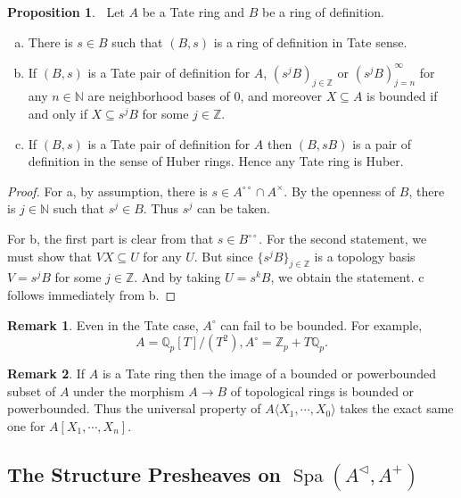 \documentclass[10pt]{article}
\numberwithin{equation}{section}
\theoremstyle{definition}
\newtheorem{proposition}{Proposition}[subsection]
\newtheorem{remark}{Remark}[subsection]
\DeclareMathOperator{\Spa}{Spa}
\newcommand{\N}[0]{\mathbb{N}}
\newcommand{\Z}[0]{\mathbb{Z}}
\newcommand{\Q}[0]{\mathbb{Q}}
\newcommand{\dcirc}[0]{{\circ\circ}}
\begin{document}
\begin{proposition}$\:$
    \label{fact_18_11}
    Let $A$ be a Tate ring and $B$ be a ring of definition.
    \begin{enumerate}[a.]
        \item There is $s\in B$ such that $(B,s)$ is a ring of definition in Tate sense.
        \item If $(B,s)$ is a Tate pair of definition for $A$, $(s^jB)_{j\in\Z}$ or $(s^jB)^{\infty}_{j=n}$ for any $n\in\N$ are neighborhood bases of $0$, and moreover $X\subseteq A$ is bounded if and only if $X\subseteq s^jB$ for some $j\in\Z$.
        \item If $(B,s)$ is a Tate pair of definition for $A$ then $(B,sB)$ is a pair of definition in the sense of Huber rings. Hence any Tate ring is Huber.
    \end{enumerate}
\end{proposition}

\begin{proof}
    For a, by assumption, there is $s\in A^\dcirc\cap A^\times$. By the openness of $B$, there is $j\in\N$ such that $s^j\in B$. Thus $s^j$ can be taken.
    \par For b, the first part is clear from that $s\in B^\dcirc$. For the second statement, we must show that $V X\subseteq U$ for any $U$. But since $\{s^jB\}_{j\in\Z}$ is a topology basis $V = s^jB$ for some $j\in\Z$. And by taking $U=s^kB$, we obtain the statement. c follows immediately from b.
\end{proof}

\begin{remark}
    \label{remark_18_3}
    Even in the Tate case, $A^\circ$ can fail to be bounded. For example,
    \begin{equation*}
        A=\Q_p[T]/(T^2), A^\circ = \Z_p+T\Q_p.
    \end{equation*}
\end{remark}

\begin{remark}
    \label{remark_18_4}
    If $A$ is a Tate ring then the image of a bounded or powerbounded subset of $A$ under the morphism $A\to B$ of topological rings is bounded or powerbounded.
    Thus the universal property of $A\langle X_1,\cdots,X_0\rangle$ takes the exact same one for $A[X_1,\cdots,X_n]$.
\end{remark}

\subsection{The Structure Presheaves on $\Spa(A^{\triangleleft},A^+)$}
\end{document}
